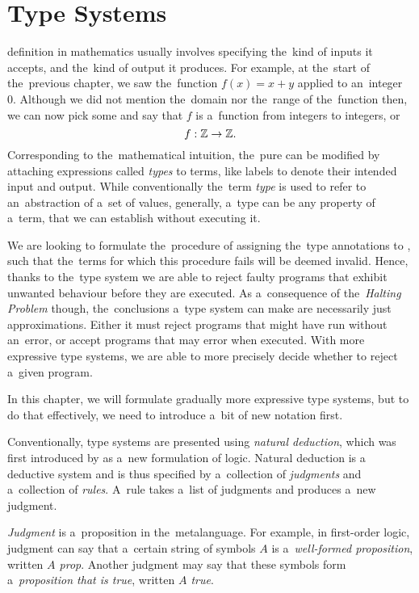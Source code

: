 \chapter{Type Systems}\label{cha:typesystems}

 definition in mathematics usually involves
specifying the~kind of inputs it accepts, and the~kind of output it produces.
For example, at the~start of the~previous chapter, we saw the~function $f(x) =
x + y$ applied to an~integer 0. Although we did not mention the~domain nor
the~range of the~function then, we can now pick some and say that $f$ is
a~function from integers to integers, or
\[
  f: \mathbb{Z} \to \mathbb{Z}.
\]
Corresponding to the~mathematical intuition, the~pure \lc can be modified by
attaching expressions called \emph{types} to terms, like labels to denote their
intended input and output. While conventionally the~term \emph{type} is used to
refer to an~abstraction of a~set of values, generally, a~type can be any
property of a~term, that we can establish without executing it.

We are looking to formulate the~procedure of assigning the~type annotations to
\lts, such that the~terms for which this procedure fails will be deemed
invalid. Hence, thanks to the~type system we are able to reject faulty programs
that exhibit unwanted behaviour before they are executed. As a~consequence of
the~\emph{Halting Problem} though, the~conclusions a~type system can make are
necessarily just approximations. Either it must reject programs that might have
run without an~error, or accept programs that may error when executed. With more
expressive type systems, we are able to more precisely decide whether to reject
a~given program.

In this chapter, we will formulate gradually more expressive type systems,
but to do that effectively, we need to introduce a~bit of new notation first.

\label{sec:natural_deduction}

Conventionally, type systems are presented using \emph{natural deduction}, which
was first introduced by \citet{gentzen_1935} as a~new formulation of logic.
Natural deduction is a deductive system and is thus specified by a~collection of
\emph{judgments} and a~collection of \emph{rules}. A~rule takes a~list of
judgments and produces a~new judgment.

\emph{Judgment} is a~proposition in the~metalanguage. For example, in
first-order logic, judgment can say that a~certain string of symbols $A$ is
a~\emph{well-formed proposition}, written \emph{$A$ prop}. Another judgment may
say that these symbols form a~\emph{proposition that is true}, written
\emph{$A$ true}.

